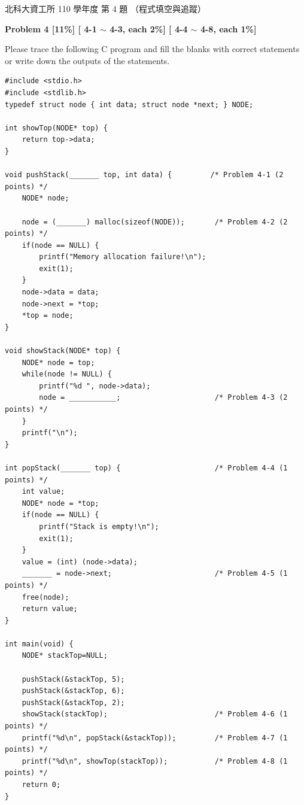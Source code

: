 \begin{pastexam}[label={px:ntut-110-prog-03}]{北科大資工所 110 學年度 第 4 題}
（程式填空與追蹤）

\textbf{Problem 4 [11\%] [ 4-1 $\sim$ 4-3, each 2\%] [ 4-4 $\sim$ 4-8, each 1\%]}

Please trace the following C program and fill the blanks with correct statements or write down the
outputs of the statements.
\begin{verbatim}
#include <stdio.h>
#include <stdlib.h>
typedef struct node { int data; struct node *next; } NODE;

int showTop(NODE* top) {
    return top->data;
}

void pushStack(_______ top, int data) {         /* Problem 4-1 (2 points) */
    NODE* node;

    node = (_______) malloc(sizeof(NODE));       /* Problem 4-2 (2 points) */
    if(node == NULL) {
        printf("Memory allocation failure!\n");
        exit(1);
    }
    node->data = data;
    node->next = *top;
    *top = node;
}

void showStack(NODE* top) {
    NODE* node = top;
    while(node != NULL) {
        printf("%d ", node->data);
        node = ___________;                      /* Problem 4-3 (2 points) */
    }
    printf("\n");
}

int popStack(_______ top) {                      /* Problem 4-4 (1 points) */
    int value;
    NODE* node = *top;
    if(node == NULL) {
        printf("Stack is empty!\n");
        exit(1);
    }
    value = (int) (node->data);
    _______ = node->next;                        /* Problem 4-5 (1 points) */
    free(node);
    return value;
}

int main(void) {
    NODE* stackTop=NULL;

    pushStack(&stackTop, 5);
    pushStack(&stackTop, 6);
    pushStack(&stackTop, 2);
    showStack(stackTop);                         /* Problem 4-6 (1 points) */
    printf("%d\n", popStack(&stackTop));         /* Problem 4-7 (1 points) */
    printf("%d\n", showTop(stackTop));           /* Problem 4-8 (1 points) */
    return 0;
}
\end{verbatim}
\end{pastexam}

